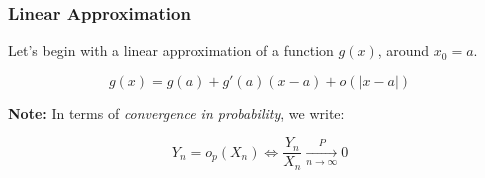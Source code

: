 \documentclass{article}
\begin{document}
\subsubsection{Linear Approximation}

Let's begin with a linear approximation of a function $g(x)$, around $x_0 = a$.

\begin{equation*}
    g(x) = g(a) + g'(a)(x-a) + o(|x-a|)
\end{equation*}

\noindent \textbf{Note:} In terms of \textit{convergence in probability}, we write:

\begin{equation*}
    Y_n = o_p(X_n) \iff \frac{Y_n}{X_n} \xrightarrow[n\to\infty]{P} 0
\end{equation*}
\end{document}
